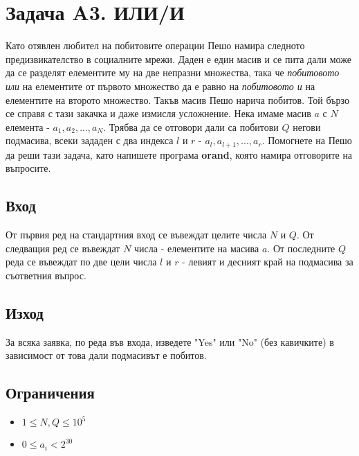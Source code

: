 \documentclass[12pt]{article}
\begin{document}
\section*{Задача A3. ИЛИ/И}

Като отявлен любител на побитовите операции Пешо намира следното предизвикателство в социалните мрежи. Даден е един масив и се пита дали може да се разделят елементите му на две непразни множества, така че \textit{побитовото или} на елементите от първото множество да е равно на \textit{побитовото и} на елементите на второто множество. Такъв масив Пешо нарича побитов. Той бързо се справя с тази закачка и даже измисля усложнение. Нека имаме масив $a$ с $N$ елемента - $a_1, a_2, ..., a_N$. Трябва да се отговори дали са побитови $Q$ негови подмасива, всеки зададен с два индекса $l$ и $r$ - $a_l, a_{l+1}, ..., a_r$. Помогнете на Пешо да реши тази задача, като напишете програма \textbf{orand}, която намира отговорите на въпросите.

\subsection*{Вход}

От първия ред на стандартния вход се въвеждат целите числа $N$ и $Q$. От следващия ред се въвеждат $N$ числа - елементите на масива $a$. От последните $Q$ реда се въвеждат по две цели числа $l$ и $r$ - левият и десният край на подмасива за съответния въпрос.

\subsection*{Изход}
За всяка заявка, по реда във входа, изведете "Yes" или "No" (без кавичките) в зависимост от това дали подмасивът е побитов.

\subsection*{Ограничения}
\begin{itemize}
	\item $1\leq N, Q\leq 10^5$
	\item $0\leq a_i < 2^{30}$
\end{itemize}
\end{document}
